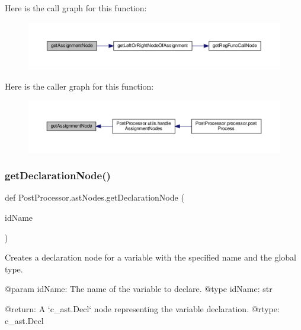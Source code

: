 Here is the call graph for this function\+:\nopagebreak
\begin{figure}[H]
\begin{center}
\leavevmode
\includegraphics[width=350pt]{namespacePostProcessor_1_1astNodes_aa6c634c9a1dceb3e9cc65cadadf5f450_cgraph}
\end{center}
\end{figure}
Here is the caller graph for this function\+:\nopagebreak
\begin{figure}[H]
\begin{center}
\leavevmode
\includegraphics[width=350pt]{namespacePostProcessor_1_1astNodes_aa6c634c9a1dceb3e9cc65cadadf5f450_icgraph}
\end{center}
\end{figure}
\mbox{\label{namespacePostProcessor_1_1astNodes_aebd6602b5bdafed24833f298500fd85c}} 
\subsubsection{\texorpdfstring{get\+Declaration\+Node()}{getDeclarationNode()}}
{\footnotesize\ttfamily def Post\+Processor.\+ast\+Nodes.\+get\+Declaration\+Node (\begin{DoxyParamCaption}\item[{}]{id\+Name }\end{DoxyParamCaption})}

\begin{DoxyVerb}Creates a declaration node for a variable with the specified name and the global type.

@param idName: The name of the variable to declare.
@type idName: str

@return: A `c_ast.Decl` node representing the variable declaration.
@rtype: c_ast.Decl
\end{DoxyVerb}
 

